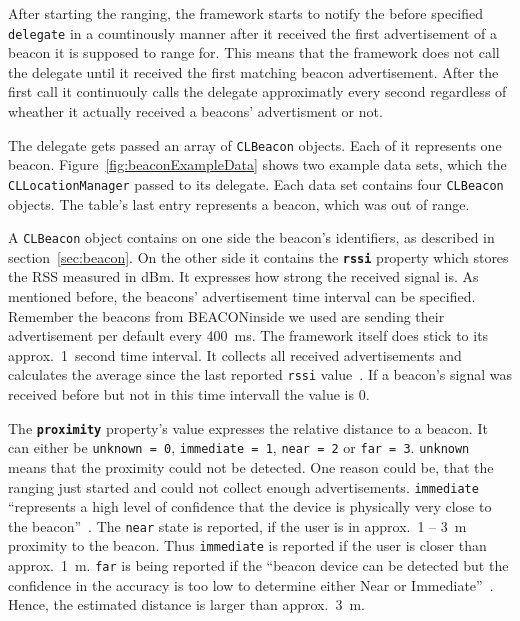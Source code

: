 After starting the ranging, the framework starts to notify the before specified \texttt{delegate} in a countinously manner after it received the first advertisement of a beacon it is supposed to range for.
This means that the framework does not call the delegate until it received the first matching beacon advertisement.
After the first call it continuouly calls the delegate approximatly every second regardless of wheather it actually received a beacons' advertisment or not.

The delegate gets passed an array of \texttt{CLBeacon} objects.
Each of it represents one beacon.
Figure~\ref{fig:beaconExampleData} shows two example data sets, which the \texttt{CLLocationManager} passed to its delegate. Each data set contains four \texttt{CLBeacon} objects. The table's last entry represents a beacon, which was out of range.

A \texttt{CLBeacon} object contains on one side the beacon's identifiers, as described in section~\ref{sec:beacon}.
On the other side it contains the \textbf{\texttt{rssi}} property which stores the \acl{RSS} measured in dBm.
It expresses how strong the received signal is.
As mentioned before, the beacons' advertisement time interval can be specified.
Remember the beacons from BEACONinside we used are sending their advertisement per default every 400~ms.
The framework itself does stick to its approx.\ 1~second time interval.
It collects all received advertisements and calculates the average since the last reported \texttt{rssi} value~\cite{video}.
If a beacon's signal was received before but not in this time intervall the value is 0.

The \textbf{\texttt{proximity}} property's value expresses the relative distance to a beacon. It can either be \texttt{unknown = 0}, \texttt{immediate = 1}, \texttt{near = 2} or \texttt{far = 3}.
\texttt{unknown} means that the proximity could not be detected. One reason could be, that the ranging just started and could not collect enough advertisements. \texttt{immediate} ``represents a high level of confidence that the device is physically very close to the beacon''~\cite{apple:getting_started}.
The \texttt{near} state is reported, if the user is in approx.\ 1 -- 3~m proximity to the beacon. Thus \texttt{immediate} is reported if the user is closer than approx.\ 1~m.
\texttt{far} is being reported if the ``beacon device can be detected but the confidence in the accuracy is too low to determine either Near or Immediate''~\cite{apple:getting_started}. Hence, the estimated distance is larger than approx.\ 3~m.

